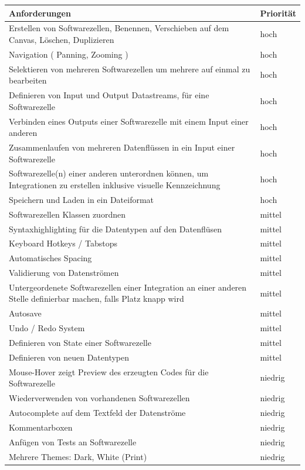 \documentclass[a4paper,12pt,oneside]{book}
\begin{document}
\begin{tabularx}{\textwidth}{X|l}
Anforderungen & Priorität\\
\hline
Erstellen von Softwarezellen, Benennen, Verschieben auf dem Canvas, Löschen, Duplizieren & hoch\\ \hline
Navigation ( Panning, Zooming ) & hoch\\ \hline
Selektieren von mehreren Softwarezellen um mehrere auf einmal zu bearbeiten & hoch\\ \hline
Definieren von Input und Output Datastreams, für eine Softwarezelle & hoch\\ \hline
Verbinden eines Outputs einer Softwarezelle mit einem Input einer anderen & hoch\\ \hline
Zusammenlaufen von mehreren Datenflüssen in ein Input einer Softwarezelle & hoch\\ \hline
Softwarezelle(n) einer anderen unterordnen können, um Integrationen zu erstellen inklusive visuelle Kennzeichnung & hoch\\ \hline
Speichern und Laden in ein Dateiformat & hoch\\ \hline
Softwarezellen Klassen zuordnen & mittel\\ \hline
Syntaxhighlighting für die Datentypen auf den Datenflüsen & mittel\\ \hline
Keyboard Hotkeys / Tabstops & mittel\\ \hline
Automatisches Spacing & mittel\\ \hline
Validierung von Datenströmen & mittel\\ \hline
Untergeordenete Softwarezellen einer Integration an einer anderen Stelle definierbar machen, falls Platz knapp wird & mittel\\ \hline
Autosave & mittel\\ \hline
Undo / Redo System & mittel\\ \hline
Definieren von State einer Softwarezelle & mittel\\ \hline
Definieren von neuen Datentypen & mittel\\ \hline
Mouse-Hover zeigt Preview des erzeugten Codes für die Softwarezelle & niedrig\\ \hline
Wiederverwenden von vorhandenen Softwarezellen & niedrig\\ \hline
Autocomplete auf dem Textfeld der Datenströme & niedrig\\ \hline
Kommentarboxen & niedrig\\ \hline
Anfügen von Tests an Softwarezelle & niedrig\\ \hline
Mehrere Themes: Dark, White (Print) & niedrig\\ \hline
\end{tabularx}
\end{document}
